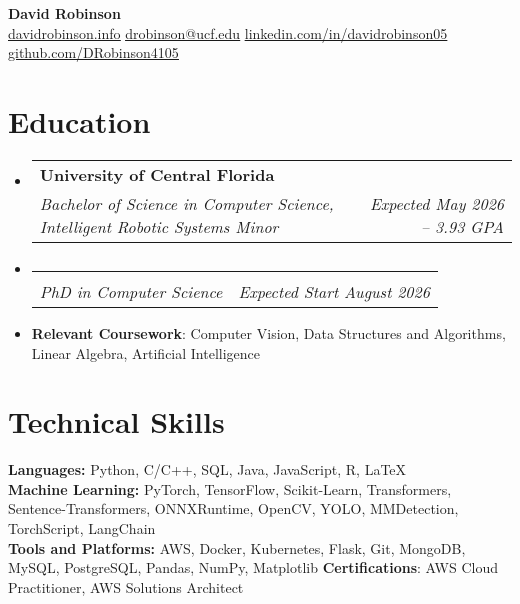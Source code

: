 \documentclass[letterpaper,11pt]{article}
\makeatletter
\newcommand{\educationItem}[1]{
  \item\small{
    {#1 \vspace{-5pt}}
  }
}
\newcommand{\resumeSubheading}[4]{
  \vspace{-2pt}\item
    \begin{tabular*}{0.97\textwidth}[t]{l@{\extracolsep{\fill}}r}
      \textbf{#1} & #2 \\
      \textit{\small#3} & \textit{\small #4} \\
    \end{tabular*}\vspace{-7pt}
}
\newcommand{\resumeSubHeadingListStart}{\begin{itemize}[leftmargin=0.15in, label={}]}
\newcommand{\resumeSubHeadingListEnd}{\end{itemize}}
\makeatother
\begin{document}
\begin{center}
  \textbf{\Huge David Robinson} \\ \vspace{2pt} \small
  \faCode\hspace{0.25pt} \href{https://www.davidrobinson.info/}{\uline{davidrobinson.info}}
  \faEnvelope\hspace{0.25pt} \href{mailto:drobinson@ucf.edu}{\uline{drobinson@ucf.edu}}
  \faLinkedin\hspace{0.25pt} \href{https://linkedin.com/in/davidrobinson05}{\uline{linkedin.com/in/davidrobinson05}}
  \faGithub\hspace{0.25pt} \href{https://github.com/DRobinson4105}{\uline{github.com/DRobinson4105}}
\end{center}

\section{Education}
  \resumeSubHeadingListStart
    \resumeSubheading
      {University of Central Florida}{}
      {Bachelor of Science in Computer Science, Intelligent Robotic Systems Minor}{Expected May 2026 -- 3.93 GPA}
      \resumeSubheading
        {\vspace{-1.5em}}{}
        {PhD in Computer Science}{Expected Start August 2026}
    \educationItem{\textbf{Relevant Coursework}: Computer Vision, Data Structures and Algorithms, Linear Algebra, Artificial Intelligence}
  \resumeSubHeadingListEnd

\section{Technical Skills}
  \begin{itemize}[leftmargin=0.15in, label={}]
    \small{\item{
      \textbf{Languages:}{ Python, C/C++, SQL, Java, JavaScript, R, LaTeX} \\
      \textbf{Machine Learning:}{ PyTorch, TensorFlow, Scikit-Learn, Transformers, Sentence-Transformers, ONNXRuntime, OpenCV, YOLO, MMDetection, TorchScript, LangChain} \\
      \textbf{Tools and Platforms:}{ AWS, Docker, Kubernetes, Flask, Git, MongoDB, MySQL, PostgreSQL, Pandas, NumPy, Matplotlib}
      \textbf{Certifications}: AWS Cloud Practitioner, AWS Solutions Architect \\
    }}
  \end{itemize}
\end{document}
